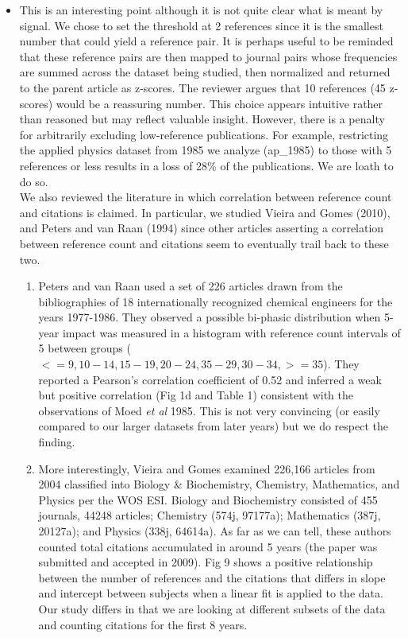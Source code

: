 \documentclass[NETN]{stjour}
\begin{document}
\begin{itemize}
\item This is an interesting point although it is not quite clear what is meant by signal. We chose to set the threshold at 2 references since it is the smallest number that could yield a reference pair. It is perhaps useful to be reminded that these reference pairs are then mapped to journal pairs whose frequencies are summed across the dataset being studied, then normalized and returned to the parent article as z-scores. The reviewer argues that 10 references (45 z-scores) would be a reassuring number. This choice appears intuitive rather than reasoned but may reflect valuable insight. However, there is a penalty for arbitrarily excluding low-reference publications. For example, restricting the applied physics dataset from 1985 we analyze (ap\_1985) to those with 5 references or less results in a loss of 28\% of the publications. We are loath to do so. \\ 

\vspace{1mm}
We also reviewed the literature in which correlation between reference count and citations is claimed. In particular, we studied Vieira and Gomes (2010), and Peters and van Raan (1994) since other articles asserting a correlation between reference count and citations seem to eventually trail back to these two. 
\begin{enumerate}
\item Peters and van Raan used a set of 226 articles drawn from the bibliographies of 18 internationally recognized chemical engineers for the years 1977-1986. They observed a possible bi-phasic distribution when 5-year impact was measured in a histogram with reference count intervals of 5 between groups ($<=9, 10-14, 15-19, 20-24, 35-29, 30-34, >=35$). They reported a Pearson's correlation coefficient of 0.52 and inferred a weak but positive correlation (Fig 1d and Table 1) consistent with the observations of Moed \emph{et al} 1985. This is not very convincing (or easily compared to our larger datasets from later years) but we do respect the finding. 

\item More interestingly, Vieira and Gomes examined 226,166 articles from 2004 classified into Biology \& Biochemistry, Chemistry, Mathematics, and Physics per the WOS ESI. Biology and Biochemistry consisted of 455 journals, 44248 articles; Chemistry (574j, 97177a); Mathematics (387j, 20127a); and Physics (338j, 64614a). As far as we can tell, these authors counted total citations accumulated in around 5 years (the paper was submitted and accepted in 2009).  Fig 9 shows a positive relationship between the number of references and the citations that differs in slope and intercept between subjects when a linear fit is applied to the data. Our study differs in that we are looking at different subsets of the data and counting citations for the first 8 years. 


\end{enumerate}
\end{itemize}
\end{document}
